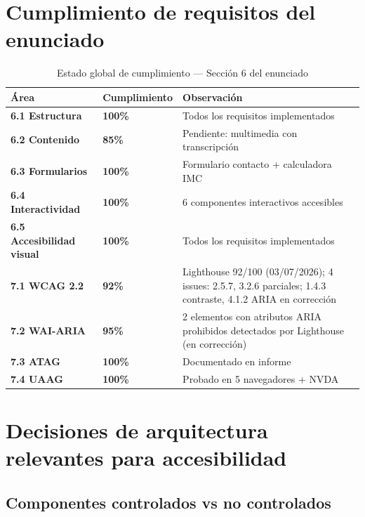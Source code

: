 \documentclass[12pt, a4paper]{article}
\begin{document}
\section{Cumplimiento de requisitos del enunciado}

\begin{table}[H]
\centering
\caption{Estado global de cumplimiento --- Sección 6 del enunciado}
\begin{tabular}{@{}>{\bfseries}p{4cm} >{\centering\arraybackslash}p{2.5cm} p{7cm}@{}}
\toprule
\rowcolor{royalblue!12}
\textbf{Área} & \textbf{Cumplimiento} & \textbf{Observación} \\
\midrule
6.1 Estructura & \textcolor{successgreen}{\bfseries 100\%} & Todos los requisitos implementados \\
6.2 Contenido & \textcolor{warningyellow}{\bfseries 85\%} & Pendiente: multimedia con transcripción \\
6.3 Formularios & \textcolor{successgreen}{\bfseries 100\%} & Formulario contacto + calculadora IMC \\
6.4 Interactividad & \textcolor{successgreen}{\bfseries 100\%} & 6 componentes interactivos accesibles \\
6.5 Accesibilidad visual & \textcolor{successgreen}{\bfseries 100\%} & Todos los requisitos implementados \\
7.1 WCAG 2.2 & \textcolor{warningyellow}{\bfseries 92\%} & Lighthouse 92/100 (03/07/2026); 4 issues: 2.5.7, 3.2.6 parciales; 1.4.3 contraste, 4.1.2 ARIA en corrección \\
7.2 WAI-ARIA & \textcolor{warningyellow}{\bfseries 95\%} & 2 elementos con atributos ARIA prohibidos detectados por Lighthouse (en corrección) \\
7.3 ATAG & \textcolor{successgreen}{\bfseries 100\%} & Documentado en informe \\
7.4 UAAG & \textcolor{successgreen}{\bfseries 100\%} & Probado en 5 navegadores + NVDA \\
\bottomrule
\end{tabular}
\end{table}

\section{Decisiones de arquitectura relevantes para accesibilidad}

\subsection{Componentes controlados vs no controlados}
\end{document}
